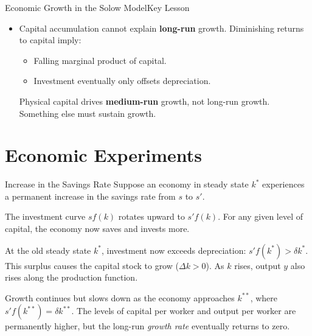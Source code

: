 \documentclass[10pt,aspectratio=169]{beamer}
\begin{document}
\begin{frame}{Economic Growth in the Solow Model}{Key Lesson}
\begin{itemize}
\item Capital accumulation cannot explain \textbf{long-run} growth.
\itemvso Diminishing returns to capital imply:
\begin{itemize}
    \item Falling marginal product of capital.
    \item Investment eventually only offsets depreciation.
\end{itemize}
\itemvso Physical capital drives \textbf{medium-run} growth, not long-run growth.
\itemvso Something else must sustain growth.
\end{itemize}
\end{frame}

\section{Economic Experiments}


\begin{frame}{Increase in the Savings Rate}
Suppose an economy in steady state $k^*$ experiences a permanent increase in the savings rate from $s$ to $s'$.

\begin{itemize}
    \itemvso  The investment curve $sf(k)$ rotates upward to $s'f(k)$. For any given level of capital, the economy now saves and invests more.

        \itemvso At the old steady state $k^*$, investment now exceeds depreciation: $s'f(k^*) > \delta k^*$.
        \itemvso This surplus causes the capital stock to grow ($\Delta k > 0$).
        \itemvso As $k$ rises, output $y$ also rises along the production function.

    \itemvso  Growth continues but slows down as the economy approaches $k^{**}$, where $s'f(k^{**}) = \delta k^{**}$.
    \itemvso The levels of capital per worker and output per worker are permanently higher, but the long-run \textit{growth rate} eventually returns to zero.
\end{itemize}
 \end{frame}
\end{document}
